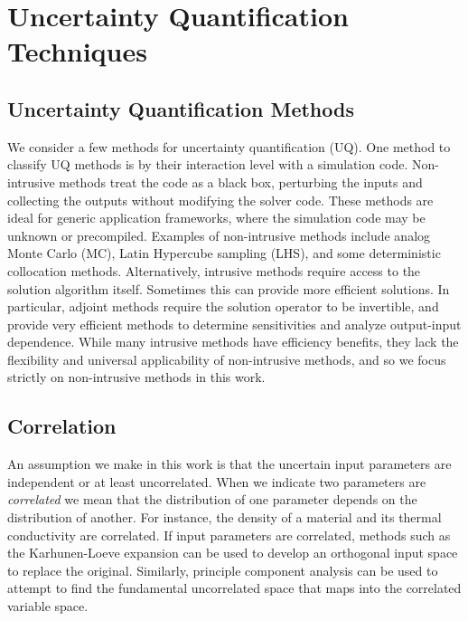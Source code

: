 
\chapter{Uncertainty Quantification Techniques} %

\label{ch:methods} %



\section{Uncertainty Quantification Methods}
We consider a few methods for uncertainty quantification (UQ).  One method to classify UQ methods is by their
interaction level with a simulation code.  Non-intrusive methods treat the code as a black box, perturbing the
inputs and collecting the outputs without modifying the solver code.  These methods are ideal for generic application
frameworks, where the simulation code may be unknown or precompiled.  Examples of non-intrusive methods
include analog Monte Carlo (MC), Latin Hypercube sampling (LHS), and some deterministic collocation methods.
Alternatively, intrusive methods require access to the solution algorithm itself.  Sometimes this can provide
more efficient solutions.  In particular, adjoint methods require the solution operator to be invertible, and
provide very efficient methods to determine sensitivities and analyze output-input dependence.  While many
intrusive methods have efficiency benefits, they lack the flexibility and universal applicability of non-intrusive
methods, and so we focus strictly on non-intrusive methods in this work.

\section{Correlation}
An assumption we make in this work is that the uncertain input parameters are independent or at least
uncorrelated.  When we indicate two parameters are \emph{correlated} we mean that the distribution of one
parameter depends on the distribution of another.  For instance, the density of a material and its thermal
conductivity are correlated.  If input parameters are correlated, methods such as the Karhunen-Loeve
expansion \cite{textbook}
can be used to develop an orthogonal
input space to replace the original.  Similarly, principle component analysis can be used to attempt to find
the fundamental uncorrelated space that maps into the correlated variable space.

